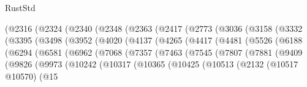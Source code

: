 \begin{lexlean}{RustStd}
\begin{coremodule}
                  (@2316
                    (@2324
                      (@2340
                        (@2348
                          (@2363
                            (@2417
                              (@2773
                                (@3036
                                  (@3158
                                    (@3332
                                      (@3395
                                        (@3498
                                          (@3952
                                            (@4020
                                              (@4137
                                                (@4265
                                                  (@4417
                                                    (@4481
                                                      (@5526
                                                        (@6188
                                                          (@6294
                                                            (@6581
                                                              (@6962
                                                                (@7068
                                                                  (@7357
                                                                    (@7463
                                                                      (@7545
                                                                        (@7807
                                                                          (@7881
                                                                            (@9409
                                                                              (@9826
                                                                                (@9973
                                                                                  (@10242
                                                                                    (@10317
                                                                                      (@10365
                                                                                        (@10425
                                                                                          (@10513
                                                                                            (@2132
                                                                                              (@10517
                                                                                                @10570)
                                                                                              (@15

\end{coremodule}
\end{lexlean}
